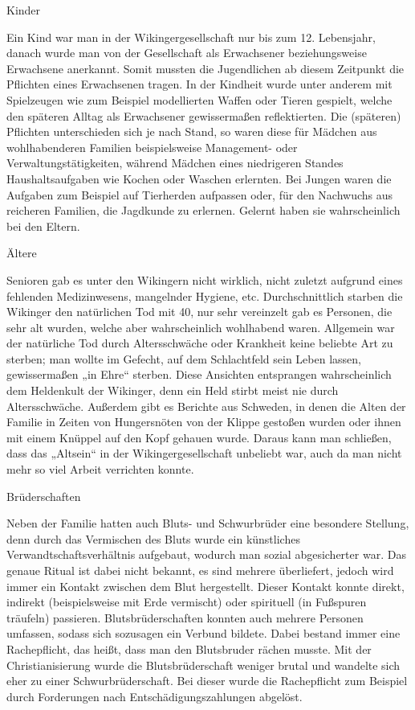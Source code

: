 \documentclass[12pt,a4paper,ngerman,openany]{book}
\begin{document}
Kinder

Ein Kind war man in der Wikingergesellschaft nur bis zum 12. Lebensjahr, danach wurde
man von der Gesellschaft als Erwachsener beziehungsweise Erwachsene anerkannt. Somit
mussten die Jugendlichen ab diesem Zeitpunkt die Pflichten eines Erwachsenen tragen. In der Kindheit wurde unter anderem mit Spielzeugen wie zum Beispiel modellierten Waffen oder Tieren gespielt, welche den späteren Alltag als Erwachsener gewissermaßen reflektierten.
Die (späteren) Pflichten unterschieden sich je nach Stand, so waren diese für Mädchen aus wohlhabenderen Familien beispielsweise Management- oder Verwaltungstätigkeiten, während Mädchen eines niedrigeren Standes Haushaltsaufgaben wie Kochen oder Waschen erlernten. Bei Jungen waren die Aufgaben zum Beispiel auf Tierherden aufpassen oder, für den Nachwuchs aus reicheren Familien, die Jagdkunde zu erlernen. Gelernt haben sie wahrscheinlich bei den Eltern.

Ältere

Senioren gab es unter den Wikingern nicht wirklich, nicht zuletzt aufgrund eines
fehlenden Medizinwesens, mangelnder Hygiene, etc. Durchschnittlich starben die Wikinger
den natürlichen Tod mit 40, nur sehr vereinzelt gab es Personen, die sehr alt wurden, welche aber wahrscheinlich wohlhabend waren. Allgemein war der natürliche Tod durch Altersschwäche oder Krankheit keine beliebte Art zu sterben; man wollte im Gefecht, auf dem Schlachtfeld sein Leben lassen, gewissermaßen „in Ehre“ sterben. Diese Ansichten entsprangen wahrscheinlich dem Heldenkult der Wikinger, denn ein Held stirbt meist nie durch Altersschwäche. Außerdem gibt es Berichte aus Schweden, in denen die Alten der Familie in Zeiten von Hungersnöten von der Klippe gestoßen wurden oder ihnen mit einem Knüppel auf den Kopf gehauen wurde. Daraus kann man schließen, dass das „Altsein“ in der Wikingergesellschaft unbeliebt war, auch da man nicht mehr so viel Arbeit verrichten konnte.

Brüderschaften

Neben der Familie hatten auch Bluts- und Schwurbrüder eine besondere Stellung, denn
durch das Vermischen des Bluts wurde ein künstliches Verwandtschaftsverhältnis aufgebaut,
wodurch man sozial abgesicherter war. Das genaue Ritual ist dabei nicht bekannt, es sind mehrere überliefert, jedoch wird immer ein Kontakt zwischen dem Blut hergestellt. Dieser Kontakt konnte direkt, indirekt (beispielsweise mit Erde vermischt) oder spirituell (in Fußspuren träufeln) passieren. Blutsbrüderschaften konnten auch mehrere Personen umfassen, sodass sich sozusagen ein Verbund bildete.
Dabei bestand immer eine Rachepflicht, das heißt, dass man den Blutsbruder rächen musste. Mit der Christianisierung wurde die Blutsbrüderschaft weniger brutal und wandelte sich eher zu einer Schwurbrüderschaft. Bei dieser wurde die Rachepflicht zum Beispiel durch Forderungen nach Entschädigungszahlungen abgelöst.
\end{document}
